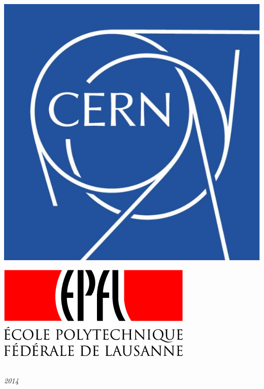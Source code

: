 \begin{titlepage}
\begin{minipage}{0.4\textwidth}
    \includegraphics[scale=0.1]{static/img/cern.jpg}
  \end{minipage}
  \begin{minipage}{0.4\textwidth}
    \centering
    \includegraphics[scale=0.355]{static/img/epfl.jpg}
  \end{minipage}
  \\\vspace*{1\baselineskip}
  \textit{2014}
\end{titlepage}
